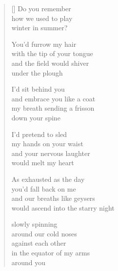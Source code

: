 \documentclass[12pt,a4paper]{article}
\begin{document}

\newpage

\poemtitle{}

\settowidth{\versewidth}{would ascend into the starry night}

\bigskip

\begin{verse}[\versewidth]
  Do you remember \\
  how we used to play \\
  winter in summer?

  You'd furrow my hair \\
  with the tip of your tongue \\
  and the field would shiver \\
  under the plough

  I'd sit behind you \\
  and embrace you like a coat \\
  my breath sending a frisson \\
  down your spine

  I'd pretend to sled \\
  my hands on your waist \\
  and your nervous laughter \\
  would melt my heart

  As exhausted as the day \\
  you'd fall back on me \\
  and our breaths like geysers \\
  would ascend into the starry night

  slowly spinning \\
  around our cold noses \\
  against each other \\
  in the equator of my arms \\
  around you
\end{verse}


\newpage

\poemtitle{}

\settowidth{\versewidth}{the infinite kaleidoscope}

\bigskip
\end{document}
